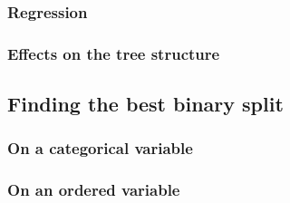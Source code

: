 \subsubsection{Regression}
\label{sec:3:criteria:regression}

\subsubsection{Effects on the tree structure}


\subsection{Finding the best binary split}
\subsubsection{On a categorical variable}
\label{sec:best-split-categorical}

\subsubsection{On an ordered variable}
\label{sec:best-split-ordered}



